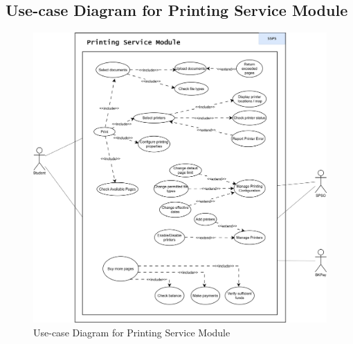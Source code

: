 \documentclass[a4paper]{report}
\begin{document}
\subsection{Use-case Diagram for Printing Service Module}

\begin{figure}[H]
    \centering
    \includegraphics[width=\textwidth]{images/usecase_diagram/use_case_printing_service.png}
    \caption{Use-case Diagram for Printing Service Module}
    \label{fig:use_case_printing_service}
\end{figure}
\end{document}
